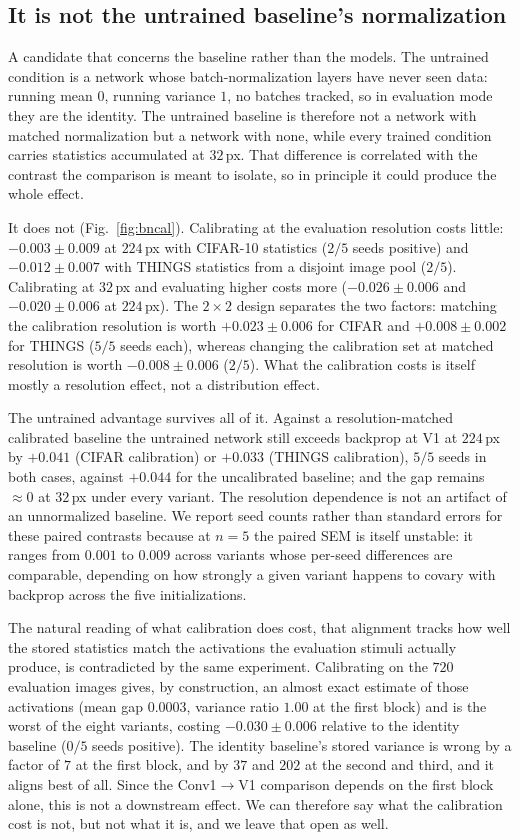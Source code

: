 \documentclass[10pt,twocolumn]{article}
\begin{document}
\subsection{It is not the untrained baseline's normalization}

A candidate that concerns the baseline rather than the models. The untrained condition is a network whose batch-normalization layers have never seen data: running mean $0$, running variance $1$, no batches tracked, so in evaluation mode they are the identity. The untrained baseline is therefore not a network with matched normalization but a network with none, while every trained condition carries statistics accumulated at $32$\,px. That difference is correlated with the contrast the comparison is meant to isolate, so in principle it could produce the whole effect.

It does not (Fig.~\ref{fig:bncal}). Calibrating at the evaluation resolution costs little: $-0.003 \pm 0.009$ at $224$\,px with CIFAR-10 statistics ($2/5$ seeds positive) and $-0.012 \pm 0.007$ with THINGS statistics from a disjoint image pool ($2/5$). Calibrating at $32$\,px and evaluating higher costs more ($-0.026 \pm 0.006$ and $-0.020 \pm 0.006$ at $224$\,px). The $2\times2$ design separates the two factors: matching the calibration resolution is worth $+0.023 \pm 0.006$ for CIFAR and $+0.008 \pm 0.002$ for THINGS ($5/5$ seeds each), whereas changing the calibration set at matched resolution is worth $-0.008 \pm 0.006$ ($2/5$). What the calibration costs is itself mostly a resolution effect, not a distribution effect.

The untrained advantage survives all of it. Against a resolution-matched calibrated baseline the untrained network still exceeds backprop at V1 at $224$\,px by $+0.041$ (CIFAR calibration) or $+0.033$ (THINGS calibration), $5/5$ seeds in both cases, against $+0.044$ for the uncalibrated baseline; and the gap remains $\approx 0$ at $32$\,px under every variant. The resolution dependence is not an artifact of an unnormalized baseline. We report seed counts rather than standard errors for these paired contrasts because at $n=5$ the paired SEM is itself unstable: it ranges from $0.001$ to $0.009$ across variants whose per-seed differences are comparable, depending on how strongly a given variant happens to covary with backprop across the five initializations.

The natural reading of what calibration does cost, that alignment tracks how well the stored statistics match the activations the evaluation stimuli actually produce, is contradicted by the same experiment. Calibrating on the $720$ evaluation images gives, by construction, an almost exact estimate of those activations (mean gap $0.0003$, variance ratio $1.00$ at the first block) and is the worst of the eight variants, costing $-0.030 \pm 0.006$ relative to the identity baseline ($0/5$ seeds positive). The identity baseline's stored variance is wrong by a factor of $7$ at the first block, and by $37$ and $202$ at the second and third, and it aligns best of all. Since the Conv1$\to$V1 comparison depends on the first block alone, this is not a downstream effect. We can therefore say what the calibration cost is not, but not what it is, and we leave that open as well.
\end{document}

